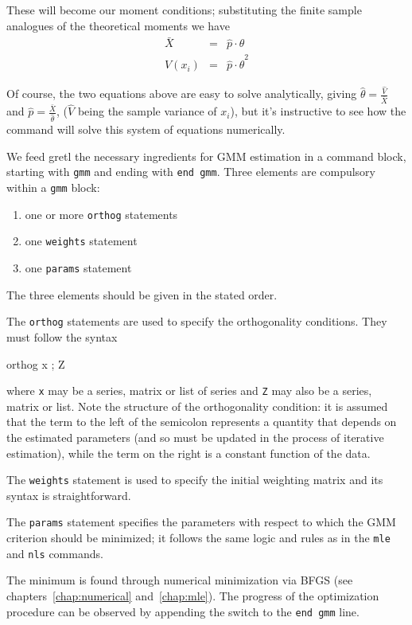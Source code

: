 These will become our moment conditions; substituting the finite
sample analogues of the theoretical moments we have
\begin{eqnarray}
  \label{eq:mm-ex-mean}
  \bar{X} & = & \hat{p} \cdot \hat{\theta} \\
  \label{eq:mm-ex-var}
  V(x_i) & = & \hat{p} \cdot \hat{\theta}^2
\end{eqnarray}

Of course, the two equations above are easy to solve analytically,
giving $\hat{\theta} = \frac{\hat{V}}{\bar{X}}$ and $\hat{p} =
\frac{\bar{X}}{\hat{\theta}}$, ($\hat{V}$ being the sample variance of
$x_i$), but it's instructive to see how the  command will
solve this system of equations numerically.

We feed gretl the necessary ingredients for GMM estimation
in a command block, starting with \texttt{gmm} and ending with
\texttt{end gmm}. Three elements are compulsory within a \texttt{gmm}
block:
\begin{enumerate}
\item one or more \texttt{orthog} statements
\item one \texttt{weights} statement
\item one \texttt{params} statement
\end{enumerate}
The three elements should be given in the stated order.

The \texttt{orthog} statements are used to specify the orthogonality
conditions.  They must follow the syntax
\begin{code}
  orthog x ; Z
\end{code}
where \texttt{x} may be a series, matrix or list of series and
\texttt{Z} may also be a series, matrix or list. Note the structure of
the orthogonality condition: it is assumed that the term to the left
of the semicolon represents a quantity that depends on the estimated
parameters (and so must be updated in the process of iterative
estimation), while the term on the right is a constant function of the
data.

The \texttt{weights} statement is used to specify the initial
weighting matrix and its syntax is straightforward. 

The \texttt{params} statement specifies the parameters with respect to
which the GMM criterion should be minimized; it follows the same logic
and rules as in the \texttt{mle} and \texttt{nls} commands.

The minimum is found through numerical minimization via BFGS (see
chapters~\ref{chap:numerical} and~\ref{chap:mle}).  The
progress of the optimization procedure can be observed by appending
the  switch to the \texttt{end gmm} line.

